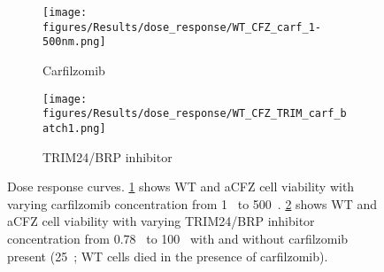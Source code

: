 \begin{figure}[htb]
\begin{subfigure}[t]{0.5\textwidth}
    \texttt{[image: figures/Results/dose\_response/WT\_CFZ\_carf\_1-500nm.png]}
    \caption{Carfilzomib}
    \label{fig:dose_response_wt_cfz_carf}
\end{subfigure}
%
\begin{subfigure}[t]{0.5\textwidth}
    \texttt{[image: figures/Results/dose\_response/WT\_CFZ\_TRIM\_carf\_batch1.png]}
    \caption{TRIM24/BRP inhibitor}
    \label{fig:dose_wt_cfz_trim24}
\end{subfigure}
    \caption[Dose response curves]{Dose response curves. \ref{fig:dose_response_wt_cfz_carf} shows WT and aCFZ cell viability with varying carfilzomib concentration from 1\si{\nano\Molar} to 500\si{\nano\Molar}.
\ref{fig:dose_wt_cfz_trim24} shows WT and aCFZ cell viability with varying TRIM24/BRP inhibitor concentration from 0.78\si{\micro\Molar} to 100\si{\micro\Molar} with and without carfilzomib present (25\si{\nano\Molar}; WT cells died in the presence of carfilzomib).  }
\label{fig:dose_response_carf_trim}
\end{figure}

